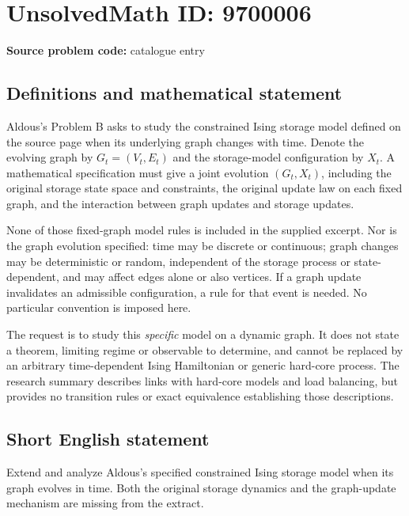 \documentclass[11pt]{article}
\begin{document}
\section*{UnsolvedMath ID: 9700006}
\textbf{Source problem code:} catalogue entry
\subsection{Definitions and mathematical statement}
Aldous's Problem B asks to study the constrained Ising storage model defined on the source page when its underlying graph changes with time. Denote the evolving graph by \(G_t=(V_t,E_t)\) and the storage-model configuration by \(X_t\). A mathematical specification must give a joint evolution \((G_t,X_t)\), including the original storage state space and constraints, the original update law on each fixed graph, and the interaction between graph updates and storage updates.

None of those fixed-graph model rules is included in the supplied excerpt. Nor is the graph evolution specified: time may be discrete or continuous; graph changes may be deterministic or random, independent of the storage process or state-dependent, and may affect edges alone or also vertices. If a graph update invalidates an admissible configuration, a rule for that event is needed. No particular convention is imposed here.

The request is to study this \emph{specific} model on a dynamic graph. It does not state a theorem, limiting regime or observable to determine, and cannot be replaced by an arbitrary time-dependent Ising Hamiltonian or generic hard-core process. The research summary describes links with hard-core models and load balancing, but provides no transition rules or exact equivalence establishing those descriptions.
\subsection{Short English statement}
Extend and analyze Aldous's specified constrained Ising storage model when its graph evolves in time. Both the original storage dynamics and the graph-update mechanism are missing from the extract.
\end{document}
